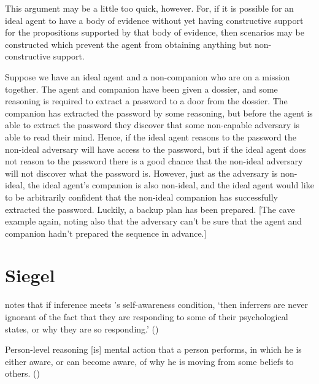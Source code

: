 \documentclass[10pt]{article}
\begin{document}
This argument may be a little too quick, however.
For, if it is possible for an ideal agent to have a body of evidence without yet having constructive support for the propositions supported by that body of evidence, then scenarios may be constructed which prevent the agent from obtaining anything but non-constructive support.

\begin{scenario}[Secrets]
  Suppose we have an ideal agent and a non-companion who are on a mission together.
  The agent and companion have been given a dossier, and some reasoning is required to extract a password to a door from the dossier.
  The companion has extracted the password by some reasoning, but before the agent is able to extract the password they discover that some non-capable adversary is able to read their mind.
  Hence, if the ideal agent reasons to the password the non-ideal adversary will have access to the password, but if the ideal agent does not reason to the password there is a good chance that the non-ideal adversary will not discover what the password is.
  However, just as the adversary is non-ideal, the ideal agent's companion is also non-ideal, and the ideal agent would like to be arbitrarily confident that the non-ideal companion has successfully extracted the password.
  Luckily, a backup plan has been prepared.
  [The cave example again, noting also that the adversary can't be sure that the agent and companion hadn't prepared the sequence in advance.]
\end{scenario}


\section{Siegel}
\label{sec:siegel}

\citeauthor{Siegel:2019aa} notes that if inference meets \citeauthor{Boghossian:2014aa}'s self-awareness condition, `then inferrers are never ignorant of the fact that they are responding to some of their psychological states, or why they are so responding.' (\citeyear[6]{Siegel:2019aa})

\begin{description}[font=\bfseries, leftmargin=.75cm, style=nextline]
\item[Self-awareness condition] Person-level reasoning [is] mental action that a person performs, in which he is either aware, or can become aware, of why he is moving from some beliefs to others.\nolinebreak
  \mbox{}\hfill\mbox{(\citeyear[16]{Boghossian:2014aa})}
\end{description}
\end{document}
